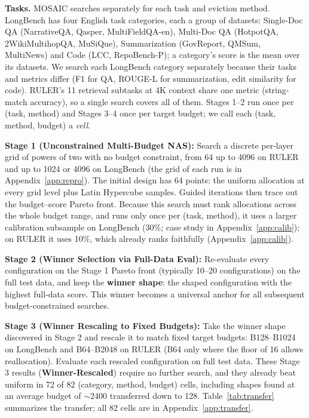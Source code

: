\documentclass[11pt]{article}
\begin{document}
\textbf{Tasks.}\label{sec:method-tasks} MOSAIC searches separately for each task and eviction method. LongBench has four English task categories, each a group of datasets: Single-Doc QA (NarrativeQA, Qasper, MultiFieldQA-en), Multi-Doc QA (HotpotQA, 2WikiMultihopQA, MuSiQue), Summarization (GovReport, QMSum, MultiNews) and Code (LCC, RepoBench-P); a category's score is the mean over its datasets. We search each LongBench category separately because their tasks and metrics differ (F1 for QA, ROUGE-L for summarization, edit similarity for code). RULER's 11 retrieval subtasks at 4K context share one metric (string-match accuracy), so a single search covers all of them. Stages 1--2 run once per (task, method) and Stages 3--4 once per target budget; we call each (task, method, budget) a \emph{cell}.

\textbf{Stage 1 (Unconstrained Multi-Budget NAS):} Search a discrete per-layer grid of powers of two with no budget constraint, from 64 up to 4096 on RULER and up to 1024 or 4096 on LongBench (the grid of each run is in Appendix~\ref{app:repro}). The initial design has 64 points: the uniform allocation at every grid level plus Latin Hypercube samples. Guided iterations then trace out the budget--score Pareto front. Because this search must rank allocations across the whole budget range, and runs only once per (task, method), it uses a larger calibration subsample on LongBench (30\%; case study in Appendix~\ref{app:calib}); on RULER it uses 10\%, which already ranks faithfully (Appendix~\ref{app:calib}).

\textbf{Stage 2 (Winner Selection via Full-Data Eval):} Re-evaluate every configuration on the Stage 1 Pareto front (typically 10--20 configurations) on the full test data, and keep the \textbf{winner shape}: the shaped configuration with the highest full-data score. This winner becomes a universal anchor for all subsequent budget-constrained searches.



\textbf{Stage 3 (Winner Rescaling to Fixed Budgets):} Take the winner shape discovered in Stage 2 and rescale it to match fixed target budgets: B128--B1024 on LongBench and B64--B2048 on RULER (B64 only where the floor of 16 allows reallocation). Evaluate each rescaled configuration on full test data. These Stage 3 results (\textbf{Winner-Rescaled}) require no further search, and they already beat uniform in 72 of 82 (category, method, budget) cells, including shapes found at an average budget of $\sim$2400 transferred down to 128. Table~\ref{tab:transfer} summarizes the transfer; all 82 cells are in Appendix~\ref{app:transfer}.
\end{document}
